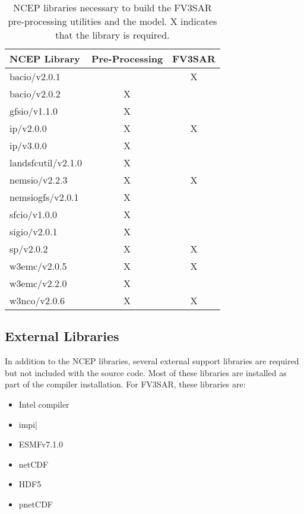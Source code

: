 \begin{table}[!htb]
\begin{center}
\begin{tabular}{ l c c }
\hline
 NCEP Library & Pre-Processing & FV3SAR \\ 
\hline
 bacio/v2.0.1       &   & X \\ 
 bacio/v2.0.2       & X &   \\ 
 gfsio/v1.1.0       & X &   \\ 
 ip/v2.0.0          & X & X \\  
 ip/v3.0.0          & X &   \\  
 landsfcutil/v2.1.0 & X &   \\ 
 nemsio/v2.2.3      & X & X \\ 
 nemsiogfs/v2.0.1   & X &   \\ 
 sfcio/v1.0.0       & X &   \\ 
 sigio/v2.0.1       & X &   \\ 
 sp/v2.0.2          & X & X \\ 
 w3emc/v2.0.5       & X & X \\   
 w3emc/v2.2.0       & X &   \\   
 w3nco/v2.0.6       & X & X \\
\hline
\end{tabular}
\caption{\label{tab:ncep_libs}NCEP libraries necessary to build the FV3SAR pre-processing utilities and the model.
                              X indicates that the library is required.}
\end{center}
\end{table}

\subsection{External Libraries}

In addition to the NCEP libraries, several external support libraries are required but not included with
the source code.  Most of these libraries are installed as part of the compiler installation.  For FV3SAR, these
libraries are:

  \begin{itemize}
    \item Intel compiler
    \item impi|
    \item ESMFv7.1.0
    \item netCDF
    \item HDF5
    \item pnetCDF
  \end{itemize}


